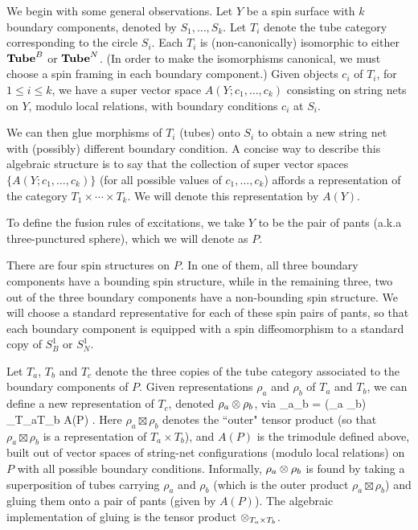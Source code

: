 We begin with some general observations.
Let $Y$ be a spin surface with $k$ boundary components, denoted by $S_1,\ldots,S_k$.
Let $T_i$ denote the tube category corresponding to the circle $S_i$.
Each $T_i$ is (non-canonically) isomorphic to either $\textbf{Tube}^B$ or $\textbf{Tube}^N$.
(In order to make the isomorphisms canonical, we must choose a spin framing in each
boundary component.)
Given objects $c_i$ of $T_i$, for $1\le i \le k$, we have a super vector space $A(Y; c_1,\ldots,c_k)$ consisting on string nets
on $Y$, modulo local relations, with boundary conditions $c_i$ at $S_i$.

We can then glue morphisms of $T_i$ (tubes) onto $S_i$ to obtain a new string net with (possibly) different boundary condition.
A concise way to describe this algebraic structure is to say that the collection of super vector spaces $\{A(Y; c_1,\ldots,c_k)\}$
(for all possible values of $c_1,\ldots,c_k$)
affords a representation of the category $T_1\times\cdots\times T_k$.
We will denote this representation by $A(Y)$.

To define the fusion rules of excitations, we take $Y$ to be the 
pair of pants (a.k.a three-punctured sphere), which we will denote as $P$. 

There are four spin structures on $P$. 
In one of them, all three boundary components have a bounding spin structure, while in 
the remaining three, two out of the three boundary components have a non-bounding spin structure.
We will choose a standard representative for each of these spin pairs of pants, 
so that each boundary component is equipped with a spin diffeomorphism to a 
standard copy of $S^1_B$ or $S^1_N$.

Let $T_a$, $T_b$ and $T_c$ denote the three copies of the tube category associated to the boundary components of $P$.
Given representations $\rho_a$ and $\rho_b$ of $T_a$ and $T_b$, we can define a new representation of $T_c$,
denoted $\rho_a\otimes\rho_b$, via
\be  \label{tctpdef}
	\rho_a\tp\rho_b = (\rho_a \boxtimes \rho_b) \tp_{T_a\times T_b} A(P) .
\ee
Here $\rho_a \boxtimes \rho_b$ denotes the ``outer" tensor product (so that $\rho_a \boxtimes \rho_b$ is a representation of $T_a\times T_b$), 
and $A(P)$ is the 
trimodule defined above, built out of
vector spaces of string-net configurations (modulo local relations) on $P$ with all possible boundary conditions. 
Informally, $\rho_a\otimes \rho_b$ is found by taking a superposition of tubes carrying $\rho_a$ and $\rho_b$ 
(which is the outer product $\rho_a\boxtimes\rho_b$) and gluing them onto a pair of pants (given by $A(P)$). 
The algebraic implementation of gluing is the tensor product $\otimes_{T_a\times T_b}$. 

